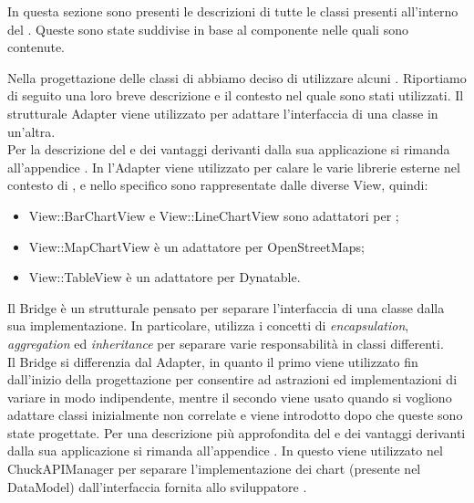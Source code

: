 		In questa sezione sono presenti le descrizioni di tutte le classi presenti all'interno del  . Queste sono state suddivise in base al componente nelle quali sono contenute.
		
		
	
		Nella progettazione delle classi di  abbiamo deciso di utilizzare alcuni . Riportiamo di seguito una loro breve descrizione e il contesto nel quale sono stati utilizzati.
			Il  strutturale Adapter viene utilizzato per adattare l'interfaccia di una classe in un'altra.\\
			Per la descrizione del  e dei vantaggi derivanti dalla sua applicazione si rimanda all'appendice .
				In  l'Adapter viene utilizzato per calare le varie librerie esterne nel contesto di \projectname{}, e nello specifico sono rappresentate dalle diverse View, quindi:
				\begin{itemize}
					\item View::BarChartView e View::LineChartView sono adattatori per ;
					\item View::MapChartView è un adattatore per OpenStreetMaps;
					\item View::TableView è un adattatore per Dynatable.
				\end{itemize}
				
			Il Bridge è un  strutturale pensato per separare l'interfaccia di una classe dalla sua implementazione. In particolare, utilizza i concetti di \textit{encapsulation}, \textit{aggregation} ed \textit{inheritance} per separare varie responsabilità in classi differenti. \\
			Il  Bridge si differenzia dal  Adapter, in quanto il primo viene utilizzato fin dall'inizio della progettazione per consentire ad astrazioni ed implementazioni di variare in modo indipendente, mentre il secondo viene usato quando si vogliono adattare classi inizialmente non correlate e viene introdotto dopo che queste sono state progettate.
			Per una descrizione più approfondita del  e dei vantaggi derivanti dalla sua applicazione si rimanda all'appendice .
				In  questo  viene utilizzato nel  ChuckAPIManager per separare l'implementazione dei chart (presente nel  DataModel) dall'interfaccia fornita allo sviluppatore .
				
